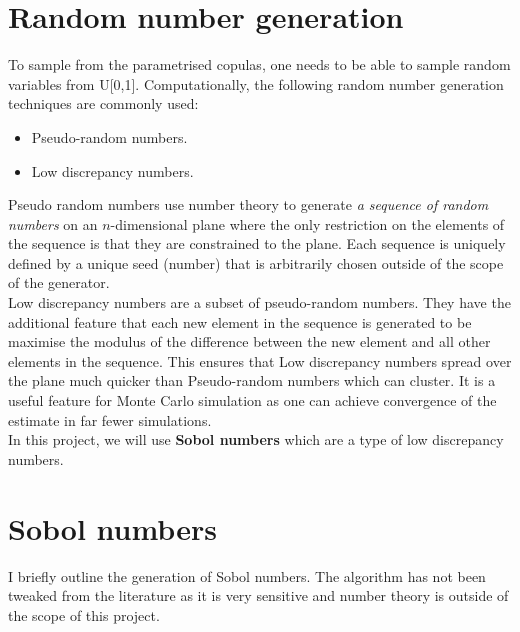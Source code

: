 \documentclass{report}
\theoremstyle{plain}
\theoremstyle{definition}
\begin{document}
\section{Random number generation}

To sample from the parametrised copulas, one needs to be able to sample random variables from U[0,1]. Computationally, the following random number generation techniques are commonly used:
\begin{itemize}
	\item Pseudo-random numbers.
	\item Low discrepancy numbers.
\end{itemize}

Pseudo random numbers use number theory to generate \emph{a sequence of random numbers} on an $n$-dimensional plane where the only restriction on the elements of the sequence is that they are constrained to the plane. Each sequence is uniquely defined by a unique seed (number) that is arbitrarily chosen outside of the scope of the generator.\\

Low discrepancy numbers are a subset of pseudo-random numbers. They have the additional feature that each new element in the sequence is generated to be maximise the modulus of the difference between the new element and all other elements in the sequence. This ensures that Low discrepancy numbers spread over the plane much quicker than Pseudo-random numbers which can cluster. It is a useful feature for Monte Carlo simulation as one can achieve convergence of the estimate in far fewer simulations.\\


In this project, we will use \textbf{Sobol numbers} which are a type of low discrepancy numbers.

\section{Sobol numbers}

I briefly outline the generation of Sobol numbers. The algorithm has not been tweaked from the literature as it is very sensitive and number theory is outside of the scope of this project.\\
\end{document}
